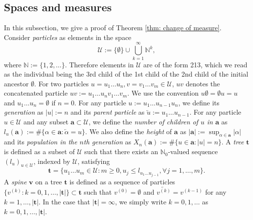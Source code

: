 \documentclass[12pt,a4paper]{amsart}
\numberwithin{equation}{section}
\begin{document}
\subsection{Spaces and measures}
\label{sec:spacesandmeasures}
	In this subsection, we give a proof of Theorem \ref{thm: change of measure}.
 	Consider \emph{particles} as elements in the space
\begin{equation*}
		\mathcal U
	:=
	\{\emptyset\}\cup\bigcup_{k=1}^\infty \mathbb N^k,
\end{equation*}
	where $\mathbb N:=\{1,2,\dots\}$.
	Therefore elements in $\mathcal U$ are of the form 213, which we read as the individual being the 3rd child of the 1st child of the 2nd child of the initial ancestor $\emptyset$.
	For two particles $u=u_1\dots u_n, v=v_1\dots v_m\in\mathcal U$, $uv$ denotes the concatenated particle $uv:=u_1\dots u_nv_1\dots v_m$.
	We use the convention $u\emptyset = \emptyset u = u$ and $u_1\dots u_n=\emptyset$ if $n=0$.
	For any particle $u:=u_1\dots u_{n-1}u_n$, we define its \emph{generation} as $| u |:=n$ and its \emph{parent particle} as $\overleftarrow{u}:=u_1\dots u_{n-1}$.
	For any particle $u \in \mathcal U$ and any subset $\mathbf a \subset \mathcal U$, we define the \emph{number of children of $u$ in $\mathbf a$} as $l_u(\mathbf a) := \#\{\alpha\in \mathbf a:\overleftarrow{\alpha}=u\} $.
	We also define the \emph{height} of $\mathbf a$ as $|\mathbf a|:=\sup_{\alpha\in \mathbf a}|\alpha|$ and its \emph{population in the $n$th generation} as $X_n(\mathbf a):=\#\{u\in \mathbf a:|u|=n\}$.
	A \emph{tree} $ \mathbf t $ is defined as a subset of $\mathcal U$ such that there exists 
 an $\mathbb N_0$-valued sequence $(l_u)_{u\in \mathcal U}$, 
	indexed by $\mathcal U$, satisfying
\begin{equation*}
		 \mathbf t 
	=
		\{u_1\dots u_m\in \mathcal U: m\ge 0, u_j\leq l_{u_1\dots u_{j-1}}, \forall  j=1,\dots,m\}.
\end{equation*}
	A \emph{spine} $ \mathbf v$ on a  tree $ \mathbf t $ is defined as a sequence of particles $\{v^{(k)}:k=0,1,\dots,| \mathbf t |\}\subset \mathbf t $ such that $v^{(0)}=\emptyset$ and $\overleftarrow{v^{(k)}}=v^{(k-1)}$ for any $k=1,\dots, | \mathbf t |$.
	In the case that $| \mathbf t |=\infty$, we simply write $k=0,1,\dots$ as $k=0,1,\dots, | \mathbf t |$.
\end{document}
